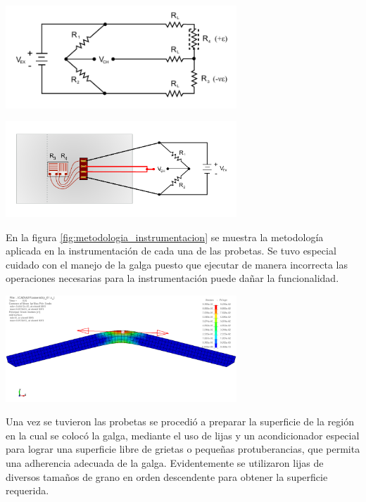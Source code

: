 \begin{center}
\includegraphics[width=0.65\textwidth]{src/ch3/circuito_conexion.pdf}
\label{fig:circuito_conexion}
\end{center}

\begin{center}
\includegraphics[width=0.65\textwidth]{src/ch3/diagrama_conexion.pdf}
\label{fig:diagrama_conexion}
\end{center}

En la figura \ref{fig:metodologia_instrumentacion} se muestra la metodología aplicada 
en la instrumentación de cada una de las probetas. Se tuvo especial cuidado con el 
manejo de la galga puesto que ejecutar de manera incorrecta las operaciones necesarias 
para la instrumentación puede dañar la funcionalidad. \\

\begin{center}
\includegraphics[width=0.65\textwidth]{src/ch3/dir_prin_strain.png}
\label{fig:dir_prin_strain}
\end{center}

Una vez se tuvieron las probetas se procedió a preparar la superficie de la región en 
la cual se colocó la galga, mediante el uso de lijas y un acondicionador especial 
para lograr una superficie libre de grietas o pequeñas protuberancias, que permita 
una adherencia adecuada de la galga. Evidentemente se utilizaron lijas de diversos 
tamaños de grano en orden descendente para obtener la superficie requerida.\\

